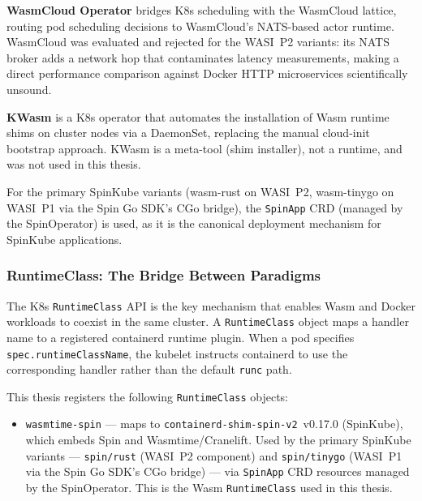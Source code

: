 \textbf{WasmCloud Operator} bridges \acs{K8s} scheduling with the WasmCloud lattice, routing pod scheduling decisions to WasmCloud's \acs{NATS}-based actor runtime. WasmCloud was evaluated and rejected for the \acs{WASI}~P2 variants: its \acs{NATS} broker adds a network hop that contaminates latency measurements, making a direct performance comparison against Docker \acs{HTTP} microservices scientifically unsound.

\textbf{KWasm} is a \acs{K8s} operator that automates the installation of \acs{Wasm} runtime shims on cluster nodes via a DaemonSet, replacing the manual cloud-init bootstrap approach. KWasm is a meta-tool (shim installer), not a runtime, and was not used in this thesis.

\begin{sloppypar}
For the primary SpinKube variants (wasm-rust on \acs{WASI}~P2, wasm-tinygo on \acs{WASI}~P1 via the Spin Go \acs{SDK}'s \acs{CGo} bridge), the \texttt{SpinApp} \acs{CRD} (managed by the SpinOperator) is used, as it is the canonical deployment mechanism for SpinKube applications.
\end{sloppypar}

\subsubsection{RuntimeClass: The Bridge Between Paradigms}

\begin{sloppypar}
The \acs{K8s} \texttt{RuntimeClass} \acs{API} is the key mechanism that enables \acs{Wasm} and Docker workloads to coexist in the same cluster. A \texttt{RuntimeClass} object maps a handler name to a registered containerd runtime plugin. When a pod specifies \texttt{spec.runtimeClassName}, the kubelet instructs containerd to use the corresponding handler rather than the default \texttt{runc} path.
\end{sloppypar}

\begin{sloppypar}
This thesis registers the following \texttt{RuntimeClass} objects:
\end{sloppypar}

\begin{itemize}
  \item \begin{sloppypar}\texttt{wasmtime-spin} --- maps to \texttt{containerd-shim-spin-v2}~v0.17.0 (SpinKube), which embeds Spin and Wasmtime/Cranelift. Used by the primary SpinKube variants --- \texttt{spin/rust} (\acs{WASI}~P2 component) and \texttt{spin/tinygo} (\acs{WASI}~P1 via the Spin Go \acs{SDK}'s \acs{CGo} bridge) --- via \texttt{SpinApp} \acs{CRD} resources managed by the SpinOperator. This is the \acs{Wasm} \texttt{RuntimeClass} used in this thesis.\end{sloppypar}
\end{itemize}

